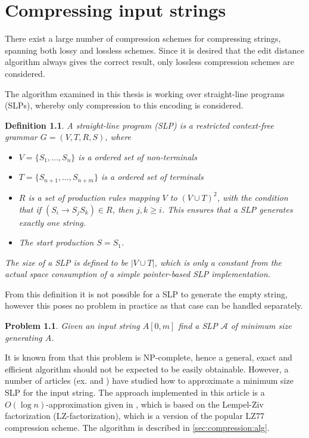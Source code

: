 \documentclass[twoside,11pt,openright]{report}
\newcommand{\str}[3]{#1[#2, #3]}
\newcommand{\SLP}[1] {\mathcal{#1}}
\newtheorem{mydef}{Definition}
\newtheorem{problem}{Problem}
\begin{document}
\chapter{Compressing input strings}
\label{ch:compressing-strings}
There exist a large number of compression schemes for compressing strings, spanning both lossy and lossless schemes. Since it is desired that the edit distance algorithm always gives the correct result, only lossless compression schemes are considered.

The algorithm examined in this thesis is working over straight-line programs (SLPs), whereby only compression to this encoding is considered.
\begin{mydef}
  \label{def:slp}
  A straight-line program (SLP) is a restricted context-free grammar $G = (V, T, R, S)$, where
  \begin{itemize}
    \item $V = \{ S_1, \dots, S_n\}$ is a ordered set of non-terminals
    \item $T = \{ S_{n + 1}, \dots, S_{n + m} \}$ is a ordered set of terminals
    \item $R$ is a set of production rules mapping $V$ to $(V \cup T)^2$, with the condition that if $(S_i \to S_jS_k) \in R$, then $j,k \geq i$. This ensures that a SLP generates exactly one string.
    \item The start production $S = S_1$.
  \end{itemize}
  The size of a SLP is defined to be $|V \cup T|$, which is only a constant from the actual space consumption of a simple pointer-based SLP implementation.
\end{mydef}
From this definition it is not possible for a SLP to generate the empty string, however this poses no problem in practice as that case can be handled separately.
\begin{problem}
  \label{compression:problem:minimum-slp}
  Given an input string $\str{A}{0}{m}$ find a SLP $\SLP{A}$ of minimum size generating $A$.
\end{problem}
It is known from \cite[p. 212]{Rytter2003211} that this problem is NP-complete, hence a general, exact and efficient algorithm should not be expected to be easily obtainable. However, a number of articles (ex. \cite{Rytter2003211} and \cite{Sakamoto2005416}) have studied how to approximate a minimum size SLP for the input string. The approach implemented in this article is a $O(\log{n})$-approximation given in \cite{Rytter2003211}, which is based on the Lempel-Ziv factorization (LZ-factorization), which is a version of the popular LZ77 compression scheme. The algorithm is described in \cref{sec:compression:alg}.
\end{document}
